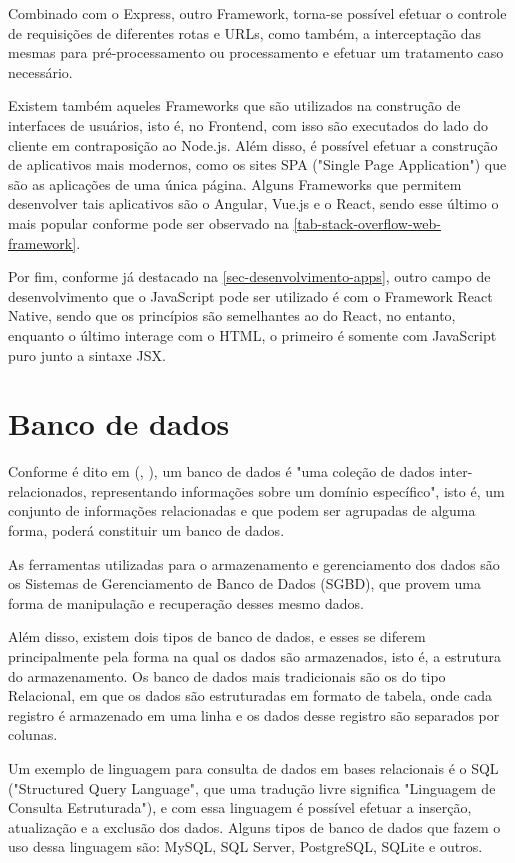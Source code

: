Combinado com o Express, outro Framework, torna-se possível efetuar o controle de requisições de diferentes rotas e URLs, como também, a interceptação das mesmas para pré-processamento ou processamento e efetuar um tratamento caso necessário.

Existem também aqueles Frameworks que são utilizados na construção de interfaces de usuários, isto é, no Frontend, com isso são executados do lado do cliente em contraposição ao Node.js. Além disso, é possível efetuar a construção de aplicativos mais modernos, como os sites SPA ("Single Page Application") que são as aplicações de uma única página. Alguns Frameworks que permitem desenvolver tais aplicativos são o Angular, Vue.js e o React, sendo esse último o mais popular conforme pode ser observado na \autoref{tab-stack-overflow-web-framework}.

Por fim, conforme já destacado na \autoref{sec-desenvolvimento-apps}, outro campo de desenvolvimento que o JavaScript pode ser utilizado é com o Framework React Native, sendo que os princípios são semelhantes ao do React, no entanto, enquanto o último interage com o HTML, o primeiro é somente com JavaScript puro junto a sintaxe JSX.

\section{Banco de dados}

Conforme é dito em (\citeauthor{silberschatz2016sistema}, \citeyear{silberschatz2016sistema}), um banco de dados é "uma coleção de dados inter-relacionados, representando informações sobre um domínio específico", isto é, um conjunto de informações relacionadas e que podem ser agrupadas de alguma forma, poderá constituir um banco de dados.

As ferramentas utilizadas para o armazenamento e gerenciamento dos dados são os Sistemas de Gerenciamento de Banco de Dados (SGBD), que provem uma forma de manipulação e recuperação desses mesmo dados.

Além disso, existem dois tipos de banco de dados, e esses se diferem principalmente pela forma na qual os dados são armazenados, isto é, a estrutura do armazenamento. Os banco de dados mais tradicionais são os do tipo Relacional, em que os dados são estruturadas em formato de tabela, onde cada registro é armazenado em uma linha e os dados desse registro são separados por colunas.

Um exemplo de linguagem para consulta de dados em bases relacionais é o SQL ("Structured Query Language", que uma tradução livre significa "Linguagem de Consulta Estruturada"), e com essa linguagem é possível efetuar a inserção, atualização e a exclusão dos dados. Alguns tipos de banco de dados que fazem o uso dessa linguagem são: MySQL, SQL Server, PostgreSQL, SQLite e outros.

